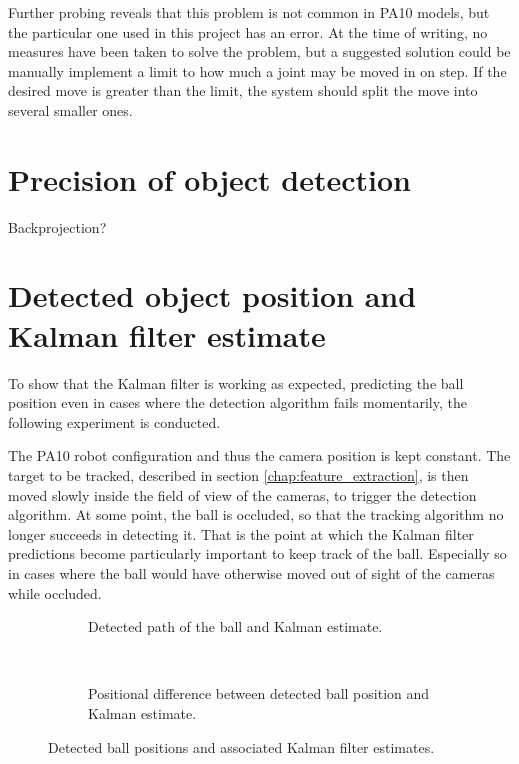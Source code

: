 Further probing reveals that this problem is not common in PA10 models, but the particular one used in this project has an error.
At the time of writing, no measures have been taken to solve the problem, but a suggested solution could be manually implement a limit to how much a joint may be moved in on step.
If the desired move is greater than the limit, the system should split the move into several smaller ones.





\section{Precision of object detection}
Backprojection?


\section{Detected object position and Kalman filter estimate}
To show that the Kalman filter is working as expected, predicting the ball position even in cases where the detection algorithm fails momentarily, the following experiment is conducted.

The PA10 robot configuration and thus the camera position is kept constant.
The target to be tracked, described in section \ref{chap:feature_extraction}, is then moved slowly inside the field of view of the cameras, to trigger the detection algorithm.
At some point, the ball is occluded, so that the tracking algorithm no longer succeeds in detecting it.
That is the point at which the Kalman filter predictions become particularly important to keep track of the ball.
Especially so in cases where the ball would have otherwise moved out of sight of the cameras while occluded.

\begin{figure}[htb]
    \centering
    \begin{subfigure}[b]{0.49\textwidth}
        \resizebox{\columnwidth}{!}{%
            
        }
        \caption{Detected path of the ball and Kalman estimate.}
        \label{fig:ball_kalman_3d}
    \end{subfigure}~
    \begin{subfigure}[b]{0.49\textwidth}
        \resizebox{\columnwidth}{!}{%
            
        }
        \caption{Positional difference between detected ball position and Kalman estimate.}
        \label{fig:ball_kalman_error}
    \end{subfigure}
    \caption{Detected ball positions and associated Kalman filter estimates.}
    \label{fig:kalman_test}
\end{figure}

